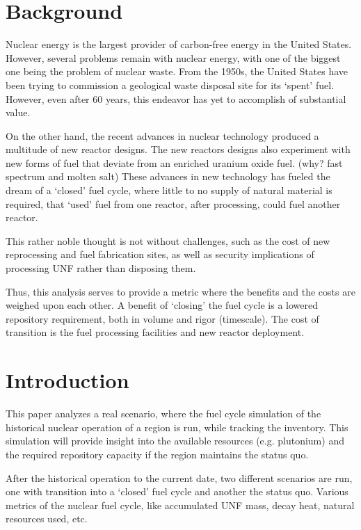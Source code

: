 \documentclass{article}
\begin{document}
\section{Background}
Nuclear energy is the largest provider of carbon-free energy
in the United States. However, several problems remain with nuclear
energy, with one of the biggest one being the problem of nuclear waste.
From the 1950s, the United States have been trying to commission a 
geological waste disposal site for its `spent' fuel. However, even
after 60 years, this endeavor has yet to accomplish of substantial value.

On the other hand, the recent advances in nuclear technology produced
a multitude of new reactor designs. The new reactors designs also 
experiment with new forms of fuel that deviate from an enriched uranium
oxide fuel. (why? fast spectrum and molten salt) These advances in new
technology has fueled the dream of a `closed' fuel cycle, where little to no
supply of natural material is required, that `used' fuel from one reactor,
after processing, could fuel another reactor.

This rather noble thought is not without challenges, such as the 
cost of new reprocessing and fuel fabrication sites, as well as
security implications of processing \gls{UNF} rather than disposing them.

Thus, this analysis serves to provide a metric where the benefits and
the costs are weighed upon each other. A benefit of `closing' the fuel cycle
is a lowered repository requirement, both in volume and rigor (timescale).
The cost of transition is the fuel processing facilities and new reactor
deployment.



\section{Introduction}
This paper analyzes a real scenario, where the fuel cycle
simulation of the historical nuclear operation of a region is run,
while tracking the inventory. This simulation will provide insight into
the available resources (e.g. plutonium) and the required repository
capacity if the region maintains the status quo.

After the historical operation to the current date, two different 
scenarios are run, one with transition into a `closed' fuel cycle
and another the status quo. Various metrics of the nuclear fuel cycle,
like accumulated \gls{UNF} mass, decay heat, natural resources used, etc.
\end{document}
